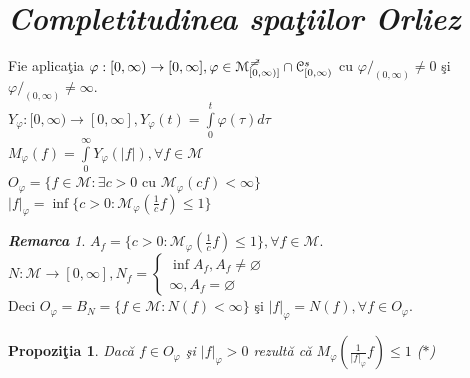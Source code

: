\documentclass[ a4paper, 12pt]{report}
\newtheorem{prop}[theorem]{\bf Propozi\c tia }
\theoremstyle{remark}
\newtheorem{remarc}{\bf Remarca}[section]
\numberwithin{equation}{section}
\begin{document}
\newpage
\section{\textit{Completitudinea spa\c tiilor Orliez}}
Fie aplica\c tia $\varphi : [0,\infty) \rightarrow [0,\infty], \varphi \in \mathcal{M}_{[0,\infty)]}^{\mc} \cap \mathcal{C}_{[0,\infty)}^s$ cu $\varphi/_{(0,\infty)} \neq 0$ \c si $\varphi/_{(0,\infty)} \neq \infty.$\\
$Y_\varphi : [0,\infty) \rightarrow [0,\infty], Y_\varphi(t) = \int\limits_{0}^{t} \varphi(\tau) d \tau$\\
$M_\varphi(f) = \int\limits_{0}^{\infty} Y_\varphi(\lvert f \rvert), \forall f \in \mathcal{M}$\\
$O_\varphi = \{f \in \mathcal{M}: \exists c>0$ cu $\mathcal{M}_\varphi(cf)<\infty\}$\\
$\lvert f \rvert_\varphi = \inf\Big \{c>0:\mathcal{M}_\varphi(\frac{1}{c}f) \leq 1\Big \}$\\
\begin{remarc}
$A_f = \Big \{c>0: \mathcal{M}_\varphi(\frac{1}{c}f) \leq 1\Big \} , \forall f \in \mathcal{M}$.\\
$N : \mathcal{M} \rightarrow [0,\infty], N_f = \begin{cases}
\inf A_f, A_f \neq \varnothing\\
\infty, A_f = \varnothing
\end{cases}$ \\
Deci $O_\varphi = B_N = \{f \in \mathcal{M}: N(f)<\infty\}$ \c si $\lvert f \rvert_\varphi = N(f), \forall f \in O_\varphi.$
\end{remarc}
\begin{prop}
Dac\u a $f \in O_\varphi$ \c si $\lvert f \rvert_\varphi >0$ rezult\u a c\u a $ M_\varphi\left (\frac{1}{\lvert f \rvert_\varphi}f\right )\leq 1$ \hspace{1mm}($\ast$)
\end{prop}
\end{document}
